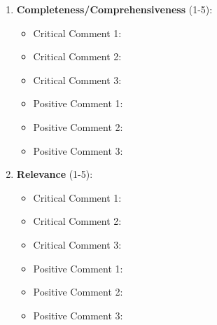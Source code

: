 \documentclass[12pt]{article}
\begin{document}
\begin{enumerate}
    \item \textbf{Completeness/Comprehensiveness} (1-5): \underline{\hspace{2cm}}
    \begin{itemize}
        \item Critical Comment 1: \underline{\hspace{12cm}}
        \item Critical Comment 2: \underline{\hspace{12cm}}
        \item Critical Comment 3: \underline{\hspace{12cm}}
        \item Positive Comment 1: \underline{\hspace{12cm}}
        \item Positive Comment 2: \underline{\hspace{12cm}}
        \item Positive Comment 3: \underline{\hspace{12cm}}
    \end{itemize}

    \vspace{0.5cm}

    \item \textbf{Relevance} (1-5): \underline{\hspace{2cm}}
    \begin{itemize}
        \item Critical Comment 1: \underline{\hspace{12cm}}
        \item Critical Comment 2: \underline{\hspace{12cm}}
        \item Critical Comment 3: \underline{\hspace{12cm}}
        \item Positive Comment 1: \underline{\hspace{12cm}}
        \item Positive Comment 2: \underline{\hspace{12cm}}
        \item Positive Comment 3: \underline{\hspace{12cm}}
    \end{itemize}

    \vspace{0.5cm}


\end{enumerate}
\end{document}
